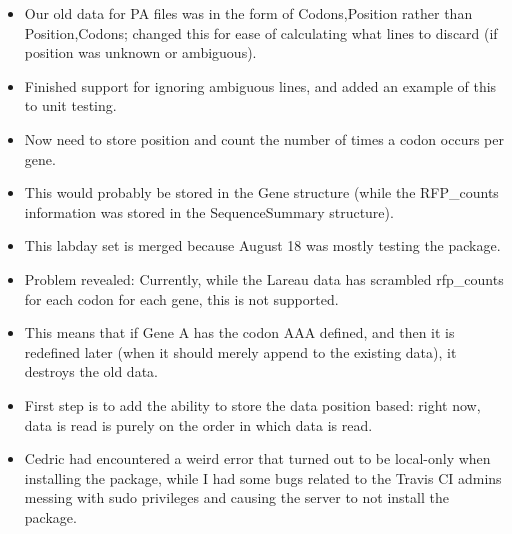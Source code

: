 \documentclass[12pt,hyperref]{labbook}
\begin{document}

\begin{itemize}
    \item Our old data for PA files was in the form of Codons,Position rather than Position,Codons; changed this for ease of calculating what lines to discard (if position was unknown or ambiguous).
    \item Finished support for ignoring ambiguous lines, and added an example of this to unit testing.
\end{itemize}


\begin{itemize}
    \item Now need to store position and count the number of times a codon occurs per gene.
    \item This would probably be stored in the Gene structure (while the RFP\_counts information was stored in the SequenceSummary structure).
\end{itemize}


\begin{itemize}
    \item This labday set is merged because August 18 was mostly testing the package.
    \item Problem revealed: Currently, while the Lareau data has scrambled rfp\_counts for each codon for each gene, this is not supported.
    \item This means that if Gene A has the codon AAA defined, and then it is redefined later (when it should merely append to the existing data), it destroys the old data.
    \item First step is to add the ability to store the data position based: right now, data is read is purely on the order in which data is read.
    \item Cedric had encountered a weird error that turned out to be local-only when installing the package, while I had some bugs related to the Travis CI admins messing with sudo privileges and causing the server to not install the package.
\end{itemize}
\end{document}
